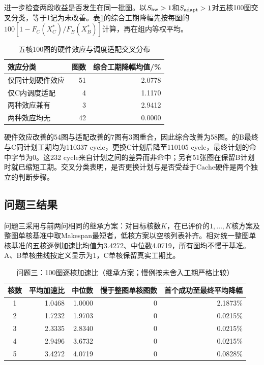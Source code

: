 进一步检查两段收益是否发生在同一批图。以$S_{\rm hw}>1$和$S_{\rm adapt}>1$对五核100图交叉分类，等于1记为未改善。表\ref{tab:c-effect-cross}的综合工期降幅先按每图的$100[1-F_C(X_C^*)/F_B(X_B^*)]$计算，再在组内等权平均。
\begin{table}[H]\centering\small
\caption{五核100图的硬件效应与调度适配交叉分布}
\label{tab:c-effect-cross}
\begin{tabular}{lrr}\toprule
效应分类 & 图数 & 综合工期降幅均值/\%\\\midrule
仅同计划硬件效应 & 51 & 2.0778\\
仅C内调度适配 & 4 & 1.1170\\
两种效应兼有 & 3 & 2.9412\\
两种效应均无 & 42 & 0.0000\\\bottomrule
\end{tabular}
\end{table}
硬件效应改善的54图与适配改善的7图有3图重合，因此综合改善为58图。的B最终与C同计划工期均为110337 cycle，更换C计划后降至110105 cycle，最终计划的命中字节为0。这232 cycle来自计划之间的差异而非命中；另有51张图在保留B计划时就已缩短工期。交叉分类表明，是否更换计划与是否受益于Cache硬件是两个独立的判断步骤。

\subsection{问题三结果}
问题三采用与前两问相同的继承方案：对目标核数$K$，在已评价的$1,\ldots,K$核方案及整图单核基准中取Makespan最短者，低核方案以空核列表补齐。相对统一整图单核基准的五核逐例加速比均值为3.4272、中位数4.0719，所有图均不慢于基准。A、B单核曲线按定义显示为1，C单核保留真实工期比。
\begin{table}[H]\centering\caption{问题三：100图逐核加速比（继承方案；慢例按未舍入工期严格比较）}\label{tab:c-results}
\begin{tabular}{crrrr}\toprule
核数 & 平均加速比 & 中位数 & 慢于整图单核图数 & 首个成功至最终平均降幅\\\midrule
1 & 1.0468 & 1.0000 & 0 & 2.1873\%\\
2 & 1.7232 & 1.9703 & 0 & 0.0215\%\\
3 & 2.3335 & 2.8340 & 0 & 0.0215\%\\
4 & 2.9496 & 3.6732 & 0 & 0.0215\%\\
5 & 3.4272 & 4.0719 & 0 & 0.0828\%\\\bottomrule
\end{tabular}\end{table}

